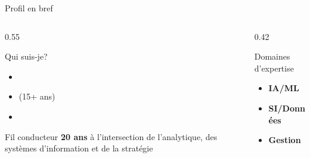 \documentclass[aspectratio=169,11pt]{beamer}
\begin{document}
\begin{frame}{Profil en bref}
  \begin{columns}[T]
    \begin{column}{0.55\textwidth}
      \begin{block}{Qui suis-je?}
        \begin{itemize}
          \item {}
          \item {} (15+ ans)
          \item {}
        \end{itemize}
      \end{block}
      \vspace{0.5em}
      \begin{alertblock}{Fil conducteur}
        \textbf{20 ans} à l'intersection de l'analytique, des systèmes d'information et de la stratégie
      \end{alertblock}
    \end{column}
    \begin{column}{0.42\textwidth}
      \centering
      \begin{block}{Domaines d'expertise}
        \begin{itemize}
          \item \textbf{IA/ML}
          \item \textbf{SI/Données}
          \item \textbf{Gestion}
        \end{itemize}
      \end{block}
    \end{column}
  \end{columns}
\end{frame}
\end{document}
